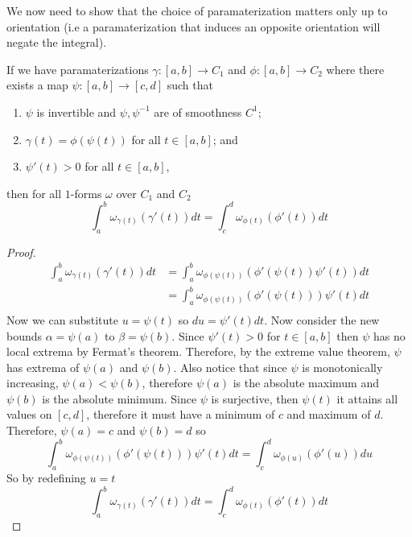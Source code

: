 \documentclass[notes.tex]{subfiles}
\begin{document}
We now need to show that the choice of paramaterization matters only up to orientation (i.e a paramaterization that induces an opposite orientation will negate the integral).
\begin{theorem} \label{integral_uniqueness_up_to_orientation_one_form}
    If we have paramaterizations $\gamma\colon [a, b] \to C_1$ and $\phi\colon [a, b] \to C_2$ where there exists a map $\psi\colon[a, b] \to [c, d]$ such that
    \begin{enumerate}[label = \arabic*)]
        \item $\psi$ is invertible and $\psi, \psi^{-1}$ are of smoothness $C^1$;
        \item $\gamma(t) = \phi(\psi(t))$ for all $t \in [a, b]$; and
        \item $\psi'(t) > 0$ for all $t \in [a, b]$,
    \end{enumerate}
    then for all $1$-forms $\omega$ over $C_1$ and $C_2$
    \[
        \int_a^b \omega_{\gamma(t)}(\gamma'(t))dt = \int_c^d \omega_{\phi(t)}(\phi'(t))dt
    \]
\end{theorem}
\begin{proof}
    \begin{align*}
        \int_a^b \omega_{\gamma(t)}(\gamma'(t))dt
        &= \int_a^b \omega_{\phi(\psi(t))}(\phi'(\psi(t))\psi'(t))dt \\
        &= \int_a^b \omega_{\phi(\psi(t))}(\phi'(\psi(t)))\psi'(t)dt \\
    \end{align*}
    Now we can substitute $u = \psi(t)$ so $du = \psi'(t)dt$. Now consider the new bounds $\alpha = \psi(a)$ to $\beta = \psi(b)$. Since $\psi'(t) > 0$ for $t \in [a, b]$ then $\psi$ has no local extrema by Fermat's theorem. Therefore, by the extreme value theorem, $\psi$ has extrema of $\psi(a)$ and $\psi(b)$. Also notice that since $\psi$ is monotonically increasing, $\psi(a) < \psi(b)$, therefore $\psi(a)$ is the absolute maximum and $\psi(b)$ is the absolute minimum. Since $\psi$ is surjective, then $\psi(t)$ it attains all values on $[c, d]$, therefore it must have a minimum of $c$ and maximum of $d$. Therefore, $\psi(a) = c$ and $\psi(b) = d$ so
    \[
        \int_a^b \omega_{\phi(\psi(t))}(\phi'(\psi(t)))\psi'(t)dt
        = \int_c^d \omega_{\phi(u)}(\phi'(u))du
    \]
    So by redefining $u = t$
    \[
        \int_a^b \omega_{\gamma(t)}(\gamma'(t))dt = \int_c^d \omega_{\phi(t)}(\phi'(t))dt
    \]
\end{proof}
\end{document}

